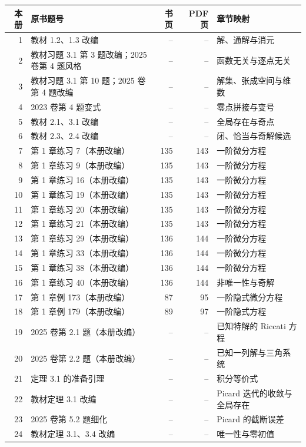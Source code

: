 \small\begin{longtable}{r p{.30\linewidth}rr p{.33\linewidth}}\toprule 本册 & 原书题号 & 书页 & PDF 页 & 章节映射\\\midrule\endhead
1 & 教材 1.2、1.3 改编 & -- & -- & 解、通解与消元\\
2 & 教材习题 3.1 第 3 题改编；2025 卷第 4 题风格 & -- & -- & 函数无关与逐点无关\\
3 & 教材习题 3.1 第 10 题；2025 卷第 4 题改编 & -- & -- & 解集、张成空间与维数\\
4 & 2023 卷第 4 题变式 & -- & -- & 零点拼接与变号\\
5 & 教材 2.1、3.1 改编 & -- & -- & 全局存在与奇点\\
6 & 教材 2.3、2.4 改编 & -- & -- & 闭、恰当与奇解候选\\
7 & 第 1 章练习 7（本册改编） & 135 & 143 & 一阶微分方程\\
8 & 第 1 章练习 9（本册改编） & 135 & 143 & 一阶微分方程\\
9 & 第 1 章练习 16（本册改编） & 135 & 143 & 一阶微分方程\\
10 & 第 1 章练习 19（本册改编） & 135 & 143 & 一阶微分方程\\
11 & 第 1 章练习 20（本册改编） & 135 & 143 & 一阶微分方程\\
12 & 第 1 章练习 21（本册改编） & 135 & 143 & 一阶微分方程\\
13 & 第 1 章练习 29（本册改编） & 136 & 144 & 一阶微分方程\\
14 & 第 1 章练习 33（本册改编） & 136 & 144 & 一阶微分方程\\
15 & 第 1 章练习 38（本册改编） & 136 & 144 & 一阶微分方程\\
16 & 第 1 章练习 40（本册改编） & 136 & 144 & 非唯一性与奇解\\
17 & 第 1 章例 173（本册改编） & 87 & 95 & 一阶隐式微分方程\\
18 & 第 1 章例 179（本册改编） & 89 & 97 & 一阶隐式方程\\
19 & 2025 卷第 2.1 题（本册改编） & -- & -- & 已知特解的 Riccati 方程\\
20 & 2025 卷第 2.2 题（本册改编） & -- & -- & 已知一列解与三角系统\\
21 & 定理 3.1 的准备引理 & -- & -- & 积分等价式\\
22 & 教材定理 3.1 改编 & -- & -- & Picard 迭代的收敛与全局存在\\
23 & 2025 卷第 5.2 题细化 & -- & -- & Picard 的截断误差\\
24 & 教材定理 3.1、3.4 改编 & -- & -- & 唯一性与零初值\\

\end{longtable}
